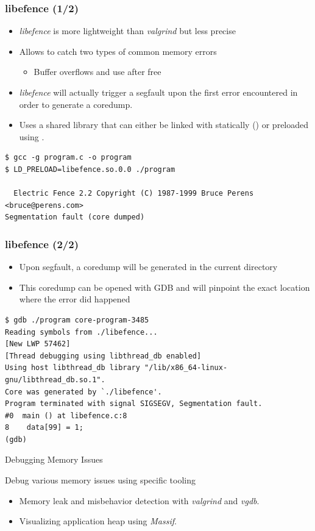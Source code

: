 \begin{frame}[fragile]
  \frametitle{libefence (1/2)}
  \begin{itemize}
    \item {\em libefence} is more lightweight than {\em valgrind} but less precise
    \item Allows to catch two types of common memory errors
    \begin{itemize}
      \item Buffer overflows and use after free
    \end{itemize}
    \item {\em libefence} will actually trigger a segfault upon the first error
          encountered in order to generate a coredump.
    \item Uses a shared library that can either be linked with statically
          () or preloaded using .
  \end{itemize}

  \begin{block}{}
    \begin{verbatim}
$ gcc -g program.c -o program
$ LD_PRELOAD=libefence.so.0.0 ./program

  Electric Fence 2.2 Copyright (C) 1987-1999 Bruce Perens <bruce@perens.com>
Segmentation fault (core dumped)
    \end{verbatim}
  \end{block}

\end{frame}

\begin{frame}[fragile]
  \frametitle{libefence (2/2)}
  \begin{itemize}
    \item Upon segfault, a coredump will be generated in the current directory
    \item This coredump can be opened with GDB and will pinpoint the exact
          location where the error did happened
  \end{itemize}
  \begin{block}{}
    \begin{verbatim}
$ gdb ./program core-program-3485
Reading symbols from ./libefence...
[New LWP 57462]
[Thread debugging using libthread_db enabled]
Using host libthread_db library "/lib/x86_64-linux-gnu/libthread_db.so.1".
Core was generated by `./libefence'.
Program terminated with signal SIGSEGV, Segmentation fault.
#0  main () at libefence.c:8
8    data[99] = 1;
(gdb) 
    \end{verbatim}
  \end{block}
\end{frame}

\setuplabframe
{Debugging Memory Issues}
{
  Debug various memory issues using specific tooling
  \begin{itemize}
    \item Memory leak and misbehavior detection with {\em valgrind} and
            {\em vgdb}.
    \item Visualizing application heap using {\em Massif}.
  \end{itemize}
}